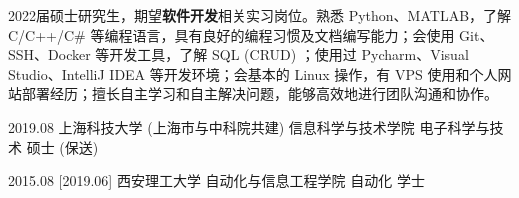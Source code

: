 \documentclass[zh]{resume}
\begin{document}
\makeheader

{\onehalfspacing\hspace{2em}%
    2022届硕士研究生，期望\textbf{软件开发}相关实习岗位。熟悉 Python、MATLAB，了解 C/C++/C\# 等编程语言，具有良好的编程习惯及文档编写能力；会使用 Git、SSH、Docker 等开发工具，了解 SQL (CRUD) ；使用过 Pycharm、Visual Studio、IntelliJ IDEA 等开发环境；会基本的 Linux 操作，有 VPS 使用和个人网站部署经历；擅长自主学习和自主解决问题，能够高效地进行团队沟通和协作。
    \par}

\begin{educations}
    \education%
    {2019.08}%
    {上海科技大学 (上海市与中科院共建) }%
    {信息科学与技术学院}%
    {电子科学与技术}%
    {硕士 (保送)}

    \separator{0.5ex}
    \education%
    {2015.08}%
    [2019.06]%
    {西安理工大学}%
    {自动化与信息工程学院}%
    {自动化}%
    {学士}
\end{educations}

\begin{competences}

\end{competences}
\end{document}
